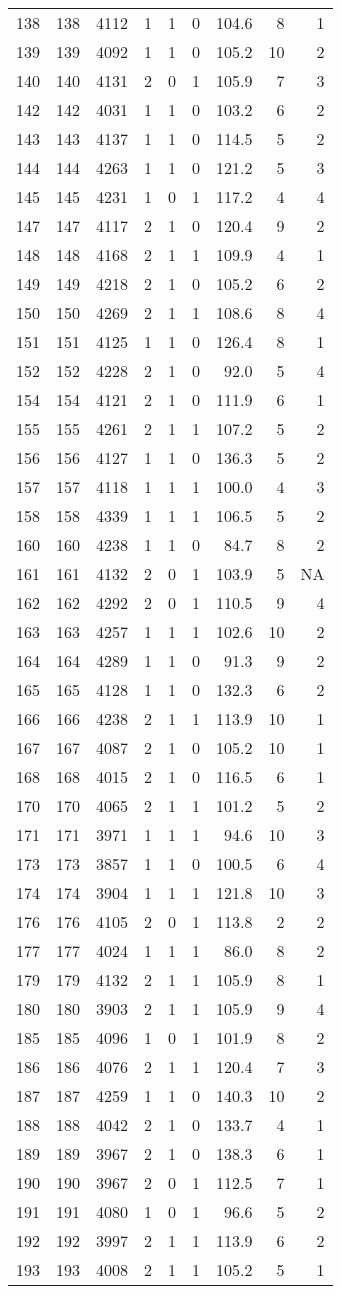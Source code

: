 \documentclass[]{article}
\begin{document}
\begin{longtable}[]{@{}lrrlrrrrr@{}}
138 & 138 & 4112 & 1 & 1 & 0 & 104.6 & 8 & 1\tabularnewline
139 & 139 & 4092 & 1 & 1 & 0 & 105.2 & 10 & 2\tabularnewline
140 & 140 & 4131 & 2 & 0 & 1 & 105.9 & 7 & 3\tabularnewline
142 & 142 & 4031 & 1 & 1 & 0 & 103.2 & 6 & 2\tabularnewline
143 & 143 & 4137 & 1 & 1 & 0 & 114.5 & 5 & 2\tabularnewline
144 & 144 & 4263 & 1 & 1 & 0 & 121.2 & 5 & 3\tabularnewline
145 & 145 & 4231 & 1 & 0 & 1 & 117.2 & 4 & 4\tabularnewline
147 & 147 & 4117 & 2 & 1 & 0 & 120.4 & 9 & 2\tabularnewline
148 & 148 & 4168 & 2 & 1 & 1 & 109.9 & 4 & 1\tabularnewline
149 & 149 & 4218 & 2 & 1 & 0 & 105.2 & 6 & 2\tabularnewline
150 & 150 & 4269 & 2 & 1 & 1 & 108.6 & 8 & 4\tabularnewline
151 & 151 & 4125 & 1 & 1 & 0 & 126.4 & 8 & 1\tabularnewline
152 & 152 & 4228 & 2 & 1 & 0 & 92.0 & 5 & 4\tabularnewline
154 & 154 & 4121 & 2 & 1 & 0 & 111.9 & 6 & 1\tabularnewline
155 & 155 & 4261 & 2 & 1 & 1 & 107.2 & 5 & 2\tabularnewline
156 & 156 & 4127 & 1 & 1 & 0 & 136.3 & 5 & 2\tabularnewline
157 & 157 & 4118 & 1 & 1 & 1 & 100.0 & 4 & 3\tabularnewline
158 & 158 & 4339 & 1 & 1 & 1 & 106.5 & 5 & 2\tabularnewline
160 & 160 & 4238 & 1 & 1 & 0 & 84.7 & 8 & 2\tabularnewline
161 & 161 & 4132 & 2 & 0 & 1 & 103.9 & 5 & NA\tabularnewline
162 & 162 & 4292 & 2 & 0 & 1 & 110.5 & 9 & 4\tabularnewline
163 & 163 & 4257 & 1 & 1 & 1 & 102.6 & 10 & 2\tabularnewline
164 & 164 & 4289 & 1 & 1 & 0 & 91.3 & 9 & 2\tabularnewline
165 & 165 & 4128 & 1 & 1 & 0 & 132.3 & 6 & 2\tabularnewline
166 & 166 & 4238 & 2 & 1 & 1 & 113.9 & 10 & 1\tabularnewline
167 & 167 & 4087 & 2 & 1 & 0 & 105.2 & 10 & 1\tabularnewline
168 & 168 & 4015 & 2 & 1 & 0 & 116.5 & 6 & 1\tabularnewline
170 & 170 & 4065 & 2 & 1 & 1 & 101.2 & 5 & 2\tabularnewline
171 & 171 & 3971 & 1 & 1 & 1 & 94.6 & 10 & 3\tabularnewline
173 & 173 & 3857 & 1 & 1 & 0 & 100.5 & 6 & 4\tabularnewline
174 & 174 & 3904 & 1 & 1 & 1 & 121.8 & 10 & 3\tabularnewline
176 & 176 & 4105 & 2 & 0 & 1 & 113.8 & 2 & 2\tabularnewline
177 & 177 & 4024 & 1 & 1 & 1 & 86.0 & 8 & 2\tabularnewline
179 & 179 & 4132 & 2 & 1 & 1 & 105.9 & 8 & 1\tabularnewline
180 & 180 & 3903 & 2 & 1 & 1 & 105.9 & 9 & 4\tabularnewline
185 & 185 & 4096 & 1 & 0 & 1 & 101.9 & 8 & 2\tabularnewline
186 & 186 & 4076 & 2 & 1 & 1 & 120.4 & 7 & 3\tabularnewline
187 & 187 & 4259 & 1 & 1 & 0 & 140.3 & 10 & 2\tabularnewline
188 & 188 & 4042 & 2 & 1 & 0 & 133.7 & 4 & 1\tabularnewline
189 & 189 & 3967 & 2 & 1 & 0 & 138.3 & 6 & 1\tabularnewline
190 & 190 & 3967 & 2 & 0 & 1 & 112.5 & 7 & 1\tabularnewline
191 & 191 & 4080 & 1 & 0 & 1 & 96.6 & 5 & 2\tabularnewline
192 & 192 & 3997 & 2 & 1 & 1 & 113.9 & 6 & 2\tabularnewline
193 & 193 & 4008 & 2 & 1 & 1 & 105.2 & 5 & 1\tabularnewline

\end{longtable}
\end{document}
